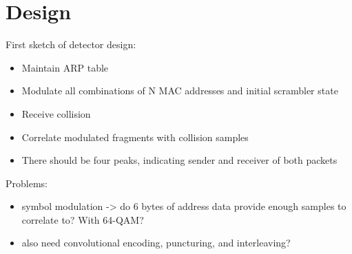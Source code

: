 
\chapter{Design}\label{ch:design}

\glsresetall %


First sketch of detector design:

\begin{itemize}
	\item Maintain ARP table
	\item Modulate all combinations of N MAC addresses and initial scrambler state
	\item Receive collision
	\item Correlate modulated fragments with collision samples
	\item There should be four peaks, indicating sender and receiver of both packets
\end{itemize}

Problems:

\begin{itemize}
	\item symbol modulation -> do 6 bytes of address data provide enough samples to correlate to? With 64-QAM?
	\item also need convolutional encoding, puncturing, and interleaving?
\end{itemize}